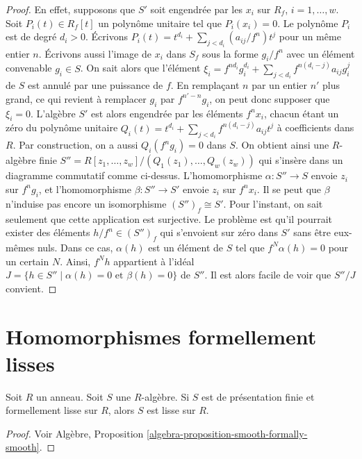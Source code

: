 \begin{proof}
En effet, supposons que $S'$ soit engendr\'ee par
les $x_i$ sur $R_f$, $i = 1, \ldots, w$. Soit $P_i(t) \in R_f[t]$
un polyn\^ome unitaire tel que $P_i(x_i) = 0$.
Le polyn\^ome $P_i$ est de degr\'e $d_i > 0$. \'Ecrivons
$P_i(t) = t^{d_i} + \sum_{j < d_i} (a_{ij}/f^n) t^j$
pour un m\^eme entier $n$. \'Ecrivons aussi
l'image de $x_i$ dans $S_f$ sous la forme $g_i / f^n$
avec un \'el\'ement convenable $g_i \in S$. On sait alors
que l'\'el\'ement
$\xi_i = f^{nd_i} g_i^{d_i} + \sum_{j < d_i} f^{n(d_i - j)} a_{ij} g_i^j$
de $S$ est annul\'e par une puissance de $f$.
En rempla\c cant $n$ par un entier $n'$ plus grand, ce qui revient \`a remplacer
$g_i$ par $f^{n' - n}g_i$, on peut donc supposer que $\xi_i = 0$.
L'alg\`ebre $S'$ est alors engendr\'ee par les \'el\'ements
$f^n x_i$, chacun \'etant un z\'ero du
polyn\^ome unitaire $Q_i(t) = t^{d_i} +
\sum_{j < d_i} f^{n(d_i - j)} a_{ij} t^j$
\`a coefficients dans $R$. Par construction, on a aussi
$Q_i(f^ng_i) = 0$ dans $S$. On obtient ainsi une $R$-alg\`ebre finie
$S'' = R[z_1, \ldots, z_w]/(Q_1(z_1), \ldots, Q_w(z_w))$
qui s'ins\`ere dans un diagramme commutatif comme ci-dessus.
L'homomorphisme $\alpha : S'' \to S$ envoie $z_i$ sur $f^ng_i$, et
l'homomorphisme $\beta : S'' \to S'$ envoie $z_i$ sur $f^nx_i$.
Il se peut que $\beta$ n'induise pas encore un
isomorphisme $(S'')_f \cong S'$.
Pour l'instant, on sait seulement que cette application
est surjective. Le probl\`eme est qu'il pourrait exister des
\'el\'ements $h/f^n \in (S'')_f$ qui s'envoient sur z\'ero
dans $S'$ sans \^etre eux-m\^emes nuls. Dans ce cas, $\alpha(h)$
est un \'el\'ement de $S$ tel que $f^N \alpha(h) = 0$
pour un certain $N$. Ainsi, $f^N h$ appartient \`a l'id\'eal
$J = \{h \in S'' \mid \alpha(h) = 0 \text{ et }
\beta(h) = 0\}$ de $S''$. Il est alors facile de voir que
$S''/J$ convient.
\end{proof}
\section{Homomorphismes formellement lisses}
\label{section-formally-smooth}

\begin{lemma}
\label{lemma-formally-smooth-smooth}
Soit $R$ un anneau. Soit $S$ une $R$-alg\`ebre.
Si $S$ est de pr\'esentation finie et formellement lisse sur $R$,
alors $S$ est lisse sur $R$.
\end{lemma}

\begin{proof}
Voir Alg\`ebre, Proposition \ref{algebra-proposition-smooth-formally-smooth}.
\end{proof}

